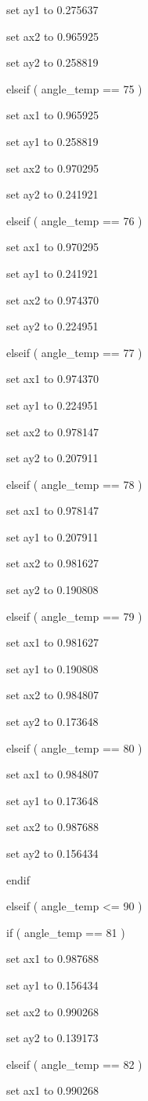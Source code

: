 \documentclass[
]{article}
\begin{document}
set ay1 to 0.275637

set ax2 to 0.965925

set ay2 to 0.258819

elseif ( angle\_temp == 75 )

set ax1 to 0.965925

set ay1 to 0.258819

set ax2 to 0.970295

set ay2 to 0.241921

elseif ( angle\_temp == 76 )

set ax1 to 0.970295

set ay1 to 0.241921

set ax2 to 0.974370

set ay2 to 0.224951

elseif ( angle\_temp == 77 )

set ax1 to 0.974370

set ay1 to 0.224951

set ax2 to 0.978147

set ay2 to 0.207911

elseif ( angle\_temp == 78 )

set ax1 to 0.978147

set ay1 to 0.207911

set ax2 to 0.981627

set ay2 to 0.190808

elseif ( angle\_temp == 79 )

set ax1 to 0.981627

set ay1 to 0.190808

set ax2 to 0.984807

set ay2 to 0.173648

elseif ( angle\_temp == 80 )

set ax1 to 0.984807

set ay1 to 0.173648

set ax2 to 0.987688

set ay2 to 0.156434

endif

elseif ( angle\_temp \textless= 90 )

if ( angle\_temp == 81 )

set ax1 to 0.987688

set ay1 to 0.156434

set ax2 to 0.990268

set ay2 to 0.139173

elseif ( angle\_temp == 82 )

set ax1 to 0.990268
\end{document}
